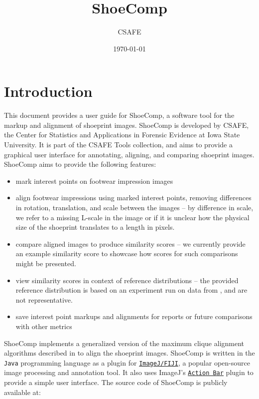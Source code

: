 \documentclass[a4paper, oneside]{memoir}
\newcommand{\rref}[2]{\texttt{\href{#2}{#1}}}
\begin{document}
\title{ShoeComp}
\author{CSAFE}
\date{\today}

\maketitle
\newpage

\chapter{Introduction}%
\label{sec:intro}

This document provides a user guide for ShoeComp, a software tool for the markup and
alignment of shoeprint images. ShoeComp is developed by CSAFE, the Center for Statistics
and Applications in Forensic Evidence at Iowa State University. It is part of the CSAFE
Tools collection, and aims to provide a graphical user interface for annotating, aligning,
and comparing shoeprint images. ShoeComp aims to provide the following features:

\begin{itemize}
	\item mark interest points on footwear impression images
	\item align footwear impressions using marked interest points, removing differences in 
		rotation, translation, and scale between the images -- by difference in scale, we
		refer to a missing L-scale in the image or if it is unclear how the physical size of the
		shoeprint translates to a length in pixels.
	\item compare aligned images to produce similarity scores -- we currently provide an
		example similarity score to showcase how scores for such comparisons might be presented.
	\item view similarity scores in context of reference distributions -- the provided reference
		distribution is based on an experiment run on data from \cite{soyoung}, and are
		not representative.
	\item save interest point markups and alignments for reports or future comparisons with other metrics
\end{itemize}

ShoeComp implements a generalized version of the maximum clique alignment algorithms
described in \cite{soyoung, gvs1} to align the shoeprint images. ShoeComp is written in
the \texttt{Java} programming language as a plugin for
\rref{ImageJ/FIJI}{https://imagej.net/software/fiji/}, a popular open-source image processing and
annotation tool. It also uses ImageJ's \rref{Action
Bar}{https://imagej.net/plugins/action-bar} plugin to provide a simple user interface. The
source code of ShoeComp is publicly available at: 
\end{document}
